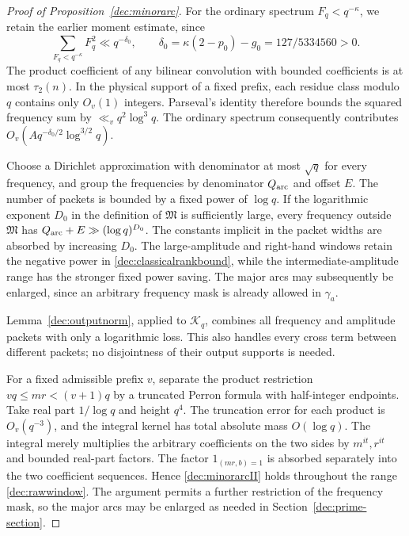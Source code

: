 \documentclass[11pt,a4paper]{article}
\theoremstyle{paperplain}
\numberwithin{equation}{section}
\begin{document}
\begin{proof}[Proof of Proposition~\ref{dec:minorarc}]
For the ordinary spectrum $F_q<q^{-\kappa}$, we retain the earlier
moment estimate, since
\begin{equation}\label{dec:ordinary}
 \sum_{F_q<q^{-\kappa}}F_q^2
 \ll q^{-\delta_0},\qquad
 \delta_0=\kappa(2-p_0)-g_0=127/5334560>0.
\end{equation}
The product coefficient of any bilinear convolution with bounded
coefficients is at most $\tau_2(n)$. In the physical support of a fixed
prefix, each residue class modulo $q$ contains only $O_v(1)$ integers.
Parseval's identity therefore bounds the squared frequency sum by
$\ll_vq^2\log^3q$. The ordinary spectrum consequently contributes
$O_v(Aq^{-\delta_0/2}\log^{3/2}q)$.

Choose a Dirichlet approximation with denominator at most $\sqrt q$
for every frequency, and group the frequencies by denominator
$Q_{\rm arc}$ and offset $E$. The number of packets is bounded by
a fixed power of $\log q$. If the logarithmic exponent $D_0$ in the definition of
$\mathfrak M$ is sufficiently large, every frequency outside
$\mathfrak M$ has $Q_{\rm arc}+E\gg(\log q)^{D_0}$.
The constants implicit in the packet widths are absorbed by increasing
$D_0$.
The large-amplitude and right-hand windows retain the negative power
in \eqref{dec:classicalrankbound}, while the intermediate-amplitude
range has the stronger fixed power saving.
The major arcs may subsequently be enlarged, since an arbitrary
frequency mask is already allowed in $\gamma_a$.

Lemma~\ref{dec:outputnorm}, applied to $\mathcal K_q$, combines
all frequency and amplitude packets with only a logarithmic loss.
This also handles every cross term between different packets;
no disjointness of their output supports is needed.

For a fixed admissible prefix $v$, separate the product restriction
$vq\le mr<(v+1)q$ by a truncated Perron formula with half-integer
endpoints. Take real part $1/\log q$ and height $q^4$.
The truncation error for each product is $O_v(q^{-3})$, and the
integral kernel has total absolute mass $O(\log q)$.
The integral merely multiplies the arbitrary coefficients on the two
sides by $m^{it},r^{it}$ and bounded real-part factors.
The factor $1_{(mr,b)=1}$ is absorbed separately into the two coefficient
sequences. Hence \eqref{dec:minorarcII} holds throughout the range
\eqref{dec:rawwindow}. The argument permits a further restriction of
the frequency mask, so the major arcs may be enlarged as needed in
Section~\ref{dec:prime-section}.
\end{proof}
\end{document}
